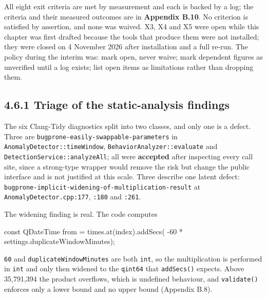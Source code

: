 \documentclass[
  12pt,
]{report}
\newenvironment{Shaded}{}{}
\newcommand{\AttributeTok}[1]{\textcolor[rgb]{0.49,0.56,0.16}{#1}}
\newcommand{\DecValTok}[1]{\textcolor[rgb]{0.25,0.63,0.44}{#1}}
\newcommand{\ExtensionTok}[1]{#1}
\newcommand{\NormalTok}[1]{#1}
\newcommand{\OperatorTok}[1]{\textcolor[rgb]{0.40,0.40,0.40}{#1}}
\begin{document}
All eight exit criteria are met by measurement and each is backed by a
log; the criteria and their measured outcomes are in \textbf{Appendix
B.10}. No criterion is satisfied by assertion, and none was waived. X3,
X4 and X5 were open while this chapter was first drafted because the
tools that produce them were not installed; they were closed on 4
November 2026 after installation and a full re-run. The policy during
the interim was: mark open, never waive; mark dependent figures as
unverified until a log exists; list open items as limitations rather
than dropping them.

\subsection{4.6.1 Triage of the static-analysis
findings}\label{triage-of-the-static-analysis-findings}

The six Clang-Tidy diagnostics split into two classes, and only one is a
defect. Three are \texttt{bugprone-easily-swappable-parameters} in
\texttt{AnomalyDetector::timeWindow},
\texttt{Behavior\-Analyzer::evaluate} and
\texttt{Detection\-Service::analyzeAll}; all were \textbf{accepted} after
inspecting every call site, since a strong-type wrapper would remove the
risk but change the public interface and is not justified at this scale.
Three describe one latent defect:
\texttt{bugprone-implicit-widening-of-multiplication-result} at
\texttt{AnomalyDetector.cpp:177}, \texttt{:180} and \texttt{:261}.

The widening finding is real. The code computes

\begin{Shaded}
\begin{Highlighting}[]
\AttributeTok{const} \ExtensionTok{QDateTime}\NormalTok{ from }\OperatorTok{=}\NormalTok{ times}\OperatorTok{.}\NormalTok{at}\OperatorTok{(}\NormalTok{index}\OperatorTok{).}\NormalTok{addSecs}\OperatorTok{(}
    \OperatorTok{{-}}\DecValTok{60} \OperatorTok{*}\NormalTok{ settings}\OperatorTok{.}\NormalTok{duplicate\-Window\-Minutes}\OperatorTok{);}
\end{Highlighting}
\end{Shaded}

\texttt{60} and \texttt{duplicate\-Window\-Minutes} are both \texttt{int},
so the multiplication is performed in \texttt{int} and only then widened
to the \texttt{qint64} that \texttt{addSecs()} expects. Above 35,791,394
the product overflows, which is undefined behaviour, and
\texttt{validate()} enforces only a lower bound and no upper bound
(Appendix B.8).
\end{document}
